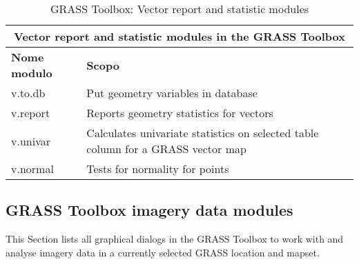 \begin{table}[ht]
\centering
\caption{GRASS Toolbox: Vector report and statistic modules}\medskip
 \begin{tabular}{|p{4cm}|p{12cm}|}
  \hline \multicolumn{2}{|c|}{\textbf{Vector report and statistic modules in the GRASS
  Toolbox}} \\
  \hline \textbf{Nome modulo} & \textbf{Scopo} \\
  \hline v.to.db & Put geometry variables in database \\
  \hline v.report & Reports geometry statistics for vectors \\
  \hline v.univar & Calculates univariate statistics on selected table column
  for a GRASS vector map \\
  \hline v.normal & Tests for normality for points\\
\hline
\end{tabular}
\end{table}

\clearpage

\subsection{GRASS Toolbox imagery data modules}

This Section lists all graphical dialogs in the GRASS Toolbox to work with
and analyse imagery data in a currently selected GRASS location and mapset.

